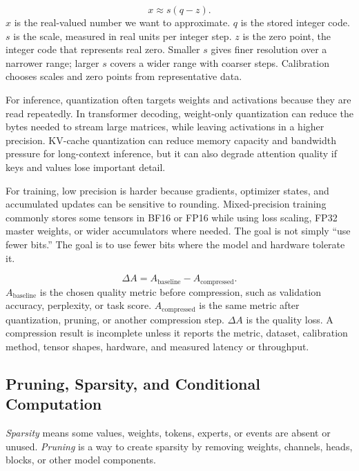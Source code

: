 \begin{keyequation}
\[
  x \approx s(q - z).
\]
\tcblower
\(x\) is the real-valued number we want to approximate. \(q\) is the stored integer code. \(s\) is the scale, measured in real units per integer step. \(z\) is the zero point, the integer code that represents real zero. Smaller \(s\) gives finer resolution over a narrower range; larger \(s\) covers a wider range with coarser steps. Calibration chooses scales and zero points from representative data.
\end{keyequation}

For inference, quantization often targets weights and activations because they are read repeatedly. In transformer decoding, weight-only quantization can reduce the bytes needed to stream large matrices, while leaving activations in a higher precision. KV-cache quantization can reduce memory capacity and bandwidth pressure for long-context inference, but it can also degrade attention quality if keys and values lose important detail.

For training, low precision is harder because gradients, optimizer states, and accumulated updates can be sensitive to rounding. Mixed-precision training commonly stores some tensors in BF16 or FP16 while using loss scaling, FP32 master weights, or wider accumulators where needed. The goal is not simply ``use fewer bits.'' The goal is to use fewer bits where the model and hardware tolerate it.

\begin{keyequation}
\[
  \Delta A = A_{\text{baseline}} - A_{\text{compressed}}.
\]
\tcblower
\(A_{\text{baseline}}\) is the chosen quality metric before compression, such as validation accuracy, perplexity, or task score. \(A_{\text{compressed}}\) is the same metric after quantization, pruning, or another compression step. \(\Delta A\) is the quality loss. A compression result is incomplete unless it reports the metric, dataset, calibration method, tensor shapes, hardware, and measured latency or throughput.
\end{keyequation}

\subsection{Pruning, Sparsity, and Conditional Computation}

\emph{Sparsity} means some values, weights, tokens, experts, or events are absent or unused. \emph{Pruning} is a way to create sparsity by removing weights, channels, heads, blocks, or other model components.

